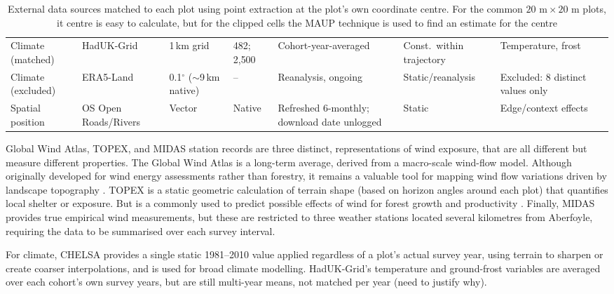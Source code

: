 \begin{table}[!htbp]
\begin{tabular}{p{1.6cm}p{2.1cm}p{1.6cm}p{1.5cm}p{2.3cm}p{1.6cm}p{2.3cm}p{0.7cm}}
Climate (matched) & HadUK-Grid & 1\,km grid & 482; 2{,}500 & Cohort-year-averaged & Const.\ within trajectory & Temperature, frost & \cite{hollis2019HadUKGrid_C3_LID} \\
Climate (excluded) & ERA5-Land & 0.1$^\circ$ ($\sim$9\,km native) & -- & Reanalysis, ongoing & Static/reanalysis & Excluded: 8 distinct values only & \cite{munozsabater2021ERA5Land_C3_LID} \\
Spatial position & OS Open Roads/Rivers & Vector & Native & Refreshed 6-monthly; download date unlogged & Static & Edge/context effects & \cite{ordnancesurveyOpenRoads_C3_LID, ordnancesurveyOpenRivers_C3_LID} \\
\hline
\end{tabular}
\caption{External data sources matched to each plot using point extraction at the plot's own
coordinate centre. For the common $20\text{~m} \times 20\text{~m}$ plots, it centre is easy to calculate, but for the clipped cells the MAUP technique is used to find an estimate for the centre \cite{openshaw1984Modifiable_C5_EVAL}}
\label{tab:data-env-sources}
\end{table}

Global Wind Atlas, TOPEX, and MIDAS station records are three distinct, representations of wind exposure, that are all different but measure different properties. The Global Wind Atlas is a long-term average, derived from a macro-scale wind-flow model. Although originally developed for wind energy assessments rather than forestry, it remains a valuable tool for mapping wind flow variations driven by landscape topography \cite{dtu2019Global_C1_SS}. TOPEX is a static geometric calculation of terrain shape (based on horizon angles around each plot) that quantifies local shelter or exposure. But is a commonly used to predict possible effects of wind for forest growth and productivity \cite{worrell1987Predicting_C1_SS}. Finally, MIDAS provides true empirical wind measurements, but these are restricted to three weather stations located several kilometres from Aberfoyle, requiring the data to be summarised over each survey interval.

For climate, CHELSA provides a single static 1981--2010 value applied regardless of a plot's actual survey year, using terrain to sharpen or create coarser interpolations, and is used for broad climate modelling. HadUK-Grid's temperature and ground-frost variables are averaged over each cohort's own survey years, but are still multi-year means, not matched per year (need to justify why). 

